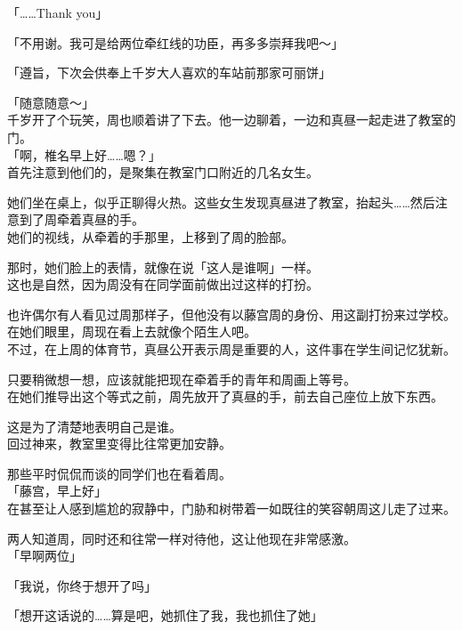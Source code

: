 「……Thank you」

「不用谢。我可是给两位牵红线的功臣，再多多崇拜我吧～」

「遵旨，下次会供奉上千岁大人喜欢的车站前那家可丽饼」

「随意随意～」\\

千岁开了个玩笑，周也顺着讲了下去。他一边聊着，一边和真昼一起走进了教室的门。\\

「啊，椎名早上好……嗯？」\\

首先注意到他们的，是聚集在教室门口附近的几名女生。

她们坐在桌上，似乎正聊得火热。这些女生发现真昼进了教室，抬起头……然后注意到了周牵着真昼的手。\\

她们的视线，从牵着的手那里，上移到了周的脸部。

那时，她们脸上的表情，就像在说「这人是谁啊」一样。\\

这也是自然，因为周没有在同学面前做出过这样的打扮。

也许偶尔有人看见过周那样子，但他没有以藤宫周的身份、用这副打扮来过学校。在她们眼里，周现在看上去就像个陌生人吧。\\

不过，在上周的体育节，真昼公开表示周是重要的人，这件事在学生间记忆犹新。

只要稍微想一想，应该就能把现在牵着手的青年和周画上等号。\\

在她们推导出这个等式之前，周先放开了真昼的手，前去自己座位上放下东西。

这是为了清楚地表明自己是谁。\\

回过神来，教室里变得比往常更加安静。

那些平时侃侃而谈的同学们也在看着周。\\

「藤宫，早上好」\\

在甚至让人感到尴尬的寂静中，门胁和树带着一如既往的笑容朝周这儿走了过来。

两人知道周，同时还和往常一样对待他，这让他现在非常感激。\\

「早啊两位」

「我说，你终于想开了吗」

「想开这话说的……算是吧，她抓住了我，我也抓住了她」\\

